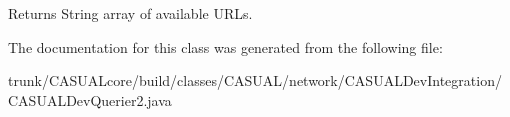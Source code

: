 \begin{DoxyReturn}{Returns}
String array of available U\-R\-Ls. 
\end{DoxyReturn}


The documentation for this class was generated from the following file\-:\begin{DoxyCompactItemize}
\item 
trunk/\-C\-A\-S\-U\-A\-Lcore/build/classes/\-C\-A\-S\-U\-A\-L/network/\-C\-A\-S\-U\-A\-L\-Dev\-Integration/C\-A\-S\-U\-A\-L\-Dev\-Querier2.\-java\end{DoxyCompactItemize}
